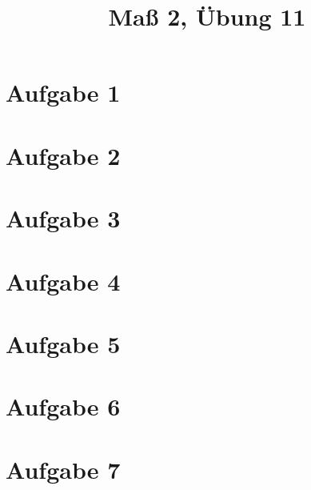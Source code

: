 \documentclass[]{article}
\author{}
\title{Maß 2, Übung 11}
\begin{document}
    \begin{titlepage}
        \maketitle
    \end{titlepage}
    \section*{Aufgabe 1}
    
    \section*{Aufgabe 2}
    
    \section*{Aufgabe 3}
    
    \section*{Aufgabe 4}
    
    \section*{Aufgabe 5}
    
    \section*{Aufgabe 6}
    
    \section*{Aufgabe 7}
    

    
    
\end{document}
